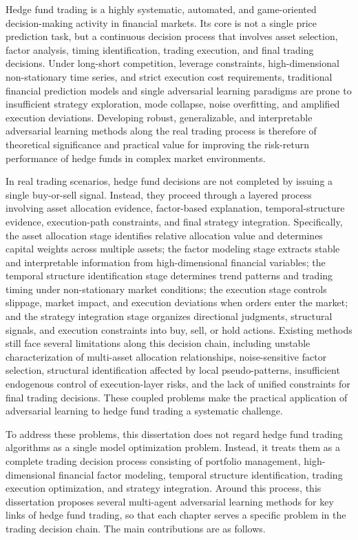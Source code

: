 \begin{eabstract}
Hedge fund trading is a highly systematic, automated, and game-oriented decision-making activity in financial markets. Its core is not a single price prediction task, but a continuous decision process that involves asset selection, factor analysis, timing identification, trading execution, and final trading decisions. Under long-short competition, leverage constraints, high-dimensional non-stationary time series, and strict execution cost requirements, traditional financial prediction models and single adversarial learning paradigms are prone to insufficient strategy exploration, mode collapse, noise overfitting, and amplified execution deviations. Developing robust, generalizable, and interpretable adversarial learning methods along the real trading process is therefore of theoretical significance and practical value for improving the risk-return performance of hedge funds in complex market environments.

In real trading scenarios, hedge fund decisions are not completed by issuing a single buy-or-sell signal. Instead, they proceed through a layered process involving asset allocation evidence, factor-based explanation, temporal-structure evidence, execution-path constraints, and final strategy integration. Specifically, the asset allocation stage identifies relative allocation value and determines capital weights across multiple assets; the factor modeling stage extracts stable and interpretable information from high-dimensional financial variables; the temporal structure identification stage determines trend patterns and trading timing under non-stationary market conditions; the execution stage controls slippage, market impact, and execution deviations when orders enter the market; and the strategy integration stage organizes directional judgments, structural signals, and execution constraints into buy, sell, or hold actions. Existing methods still face several limitations along this decision chain, including unstable characterization of multi-asset allocation relationships, noise-sensitive factor selection, structural identification affected by local pseudo-patterns, insufficient endogenous control of execution-layer risks, and the lack of unified constraints for final trading decisions. These coupled problems make the practical application of adversarial learning to hedge fund trading a systematic challenge.

To address these problems, this dissertation does not regard hedge fund trading algorithms as a single model optimization problem. Instead, it treats them as a complete trading decision process consisting of portfolio management, high-dimensional financial factor modeling, temporal structure identification, trading execution optimization, and strategy integration. Around this process, this dissertation proposes several multi-agent adversarial learning methods for key links of hedge fund trading, so that each chapter serves a specific problem in the trading decision chain. The main contributions are as follows.


\end{eabstract}
